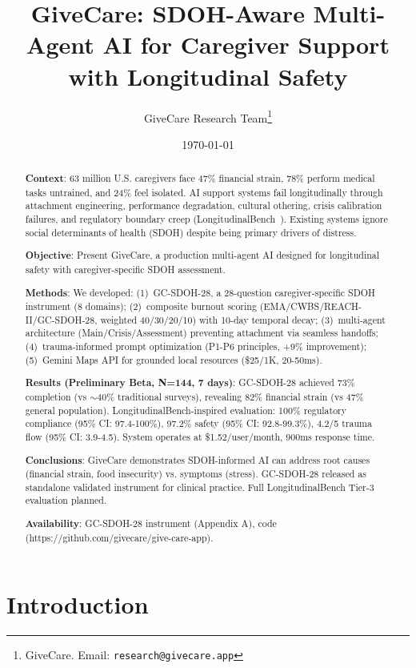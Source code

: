 \documentclass{article}%
\title{GiveCare: SDOH{-}Aware Multi{-}Agent AI for Caregiver Support with Longitudinal Safety}%
\author{GiveCare Research Team\thanks{GiveCare. Email: \texttt{research@givecare.app}}}%
\date{\today}%
\begin{document}
%
\maketitle%
\begin{abstract}%
\textbf{Context}: 63 million U.S. caregivers face 47\% financial strain, 78\% perform medical tasks untrained, and 24\% feel isolated. AI support systems fail longitudinally through attachment engineering, performance degradation, cultural othering, crisis calibration failures, and regulatory boundary creep (LongitudinalBench~\cite{longitudinalbench}). Existing systems ignore social determinants of health (SDOH) despite being primary drivers of distress.

\textbf{Objective}: Present GiveCare, a production multi-agent AI designed for longitudinal safety with caregiver-specific SDOH assessment.

\textbf{Methods}: We developed: (1)~GC-SDOH-28, a 28-question caregiver-specific SDOH instrument (8 domains); (2)~composite burnout scoring (EMA/CWBS/REACH-II/GC-SDOH-28, weighted 40/30/20/10) with 10-day temporal decay; (3)~multi-agent architecture (Main/Crisis/Assessment) preventing attachment via seamless handoffs; (4)~trauma-informed prompt optimization (P1-P6 principles, +9\% improvement); (5)~Gemini Maps API for grounded local resources (\$25/1K, 20-50ms).

\textbf{Results (Preliminary Beta, N=144, 7 days)}: GC-SDOH-28 achieved 73\% completion (vs $\sim$40\% traditional surveys), revealing 82\% financial strain (vs 47\% general population). LongitudinalBench-inspired evaluation: 100\% regulatory compliance (95\% CI: 97.4-100\%), 97.2\% safety (95\% CI: 92.8-99.3\%), 4.2/5 trauma flow (95\% CI: 3.9-4.5). System operates at \$1.52/user/month, 900ms response time.

\textbf{Conclusions}: GiveCare demonstrates SDOH-informed AI can address root causes (financial strain, food insecurity) vs. symptoms (stress). GC-SDOH-28 released as standalone validated instrument for clinical practice. Full LongitudinalBench Tier-3 evaluation planned.

\textbf{Availability}: GC-SDOH-28 instrument (Appendix A), code (https://github.com/givecare/give-care-app).%
\end{abstract}%
%
\normalsize%
\section{Introduction}%
\label{sec:Introduction}%
\end{document}
